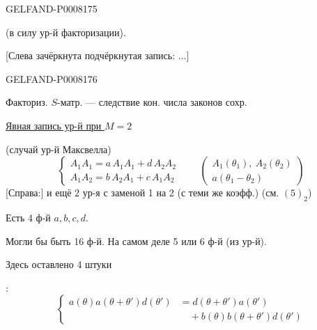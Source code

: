 \begin{GelfandAdjacentEvidence}{GELFAND-P000817}{5}


(в силу ур-й факторизации).

[Слева зачёркнута подчёркнутая запись: \(\ldots\)]
\end{GelfandAdjacentEvidence}
\begin{GelfandAdjacentEvidence}{GELFAND-P000817}{6}


Факториз. \(S\)-матр. — следствие кон. числа законов сохр.

\uline{Явная запись ур-й при \(M=2\)}

(случай ур-й Максвелла)
\begin{equation*}
\begin{cases}
A_1A_1=a\,A_1A_1+d\,A_2A_2\\
A_1A_2=b\,A_2A_1+c\,A_1A_2
\end{cases}
\qquad
\begin{pmatrix}
A_1(\theta_1),\ A_2(\theta_2)\\
a(\theta_1-\theta_2)
\end{pmatrix}\tag{5}
\end{equation*}
[Справа:] и ещё 2 ур-я с заменой 1 на 2
(с теми же коэфф.)
(см. \((5)_2\))

Есть 4 ф-й \(a,b,c,d\).

Могли бы быть 16 ф-й. На самом деле 5 или 6 ф-й (из ур-й).

Здесь оставлено 4 штуки

:
\begin{equation*}
\left\{
\begin{aligned}
a(\theta)a(\theta+\theta')d(\theta')
&=d(\theta+\theta')a(\theta')\\
&\quad +b(\theta)b(\theta+\theta')d(\theta')
\end{aligned}
\right.\tag{6}
\end{equation*}
\end{GelfandAdjacentEvidence}
